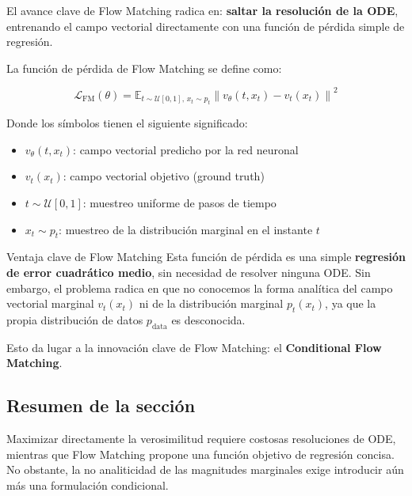 El avance clave de Flow Matching radica en: \textbf{saltar la resolución de la ODE}, entrenando el campo vectorial directamente con una función de pérdida simple de regresión.

La función de pérdida de Flow Matching se define como:

$$\mathcal{L}_{\text{FM}}(\theta) = \mathbb{E}_{t \sim \mathcal{U}[0,1], \, x_t \sim p_t} \left\| v_\theta(t, x_t) - v_t(x_t) \right\|^2$$

Donde los símbolos tienen el siguiente significado:
\begin{itemize}
    \item $v_\theta(t, x_t)$: campo vectorial predicho por la red neuronal
    \item $v_t(x_t)$: campo vectorial objetivo (ground truth)
    \item $t \sim \mathcal{U}[0,1]$: muestreo uniforme de pasos de tiempo
    \item $x_t \sim p_t$: muestreo de la distribución marginal en el instante $t$
\end{itemize}

\begin{importantbox}{Ventaja clave de Flow Matching}
Esta función de pérdida es una simple \textbf{regresión de error cuadrático medio}, sin necesidad de resolver ninguna ODE. Sin embargo, el problema radica en que no conocemos la forma analítica del campo vectorial marginal $v_t(x_t)$ ni de la distribución marginal $p_t(x_t)$, ya que la propia distribución de datos $p_{\text{data}}$ es desconocida.

Esto da lugar a la innovación clave de Flow Matching: el \textbf{Conditional Flow Matching}.
\end{importantbox}

\subsection{Resumen de la sección}

Maximizar directamente la verosimilitud requiere costosas resoluciones de ODE, mientras que Flow Matching propone una función objetivo de regresión concisa. No obstante, la no analiticidad de las magnitudes marginales exige introducir aún más una formulación condicional.

